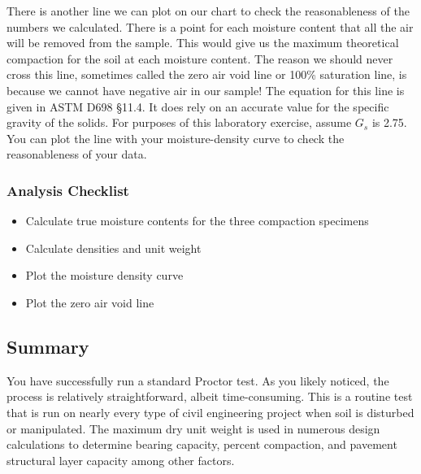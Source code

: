 \documentclass[12pt]{article}
\begin{document}
There is another line we can plot on our chart to check the reasonableness of the numbers we calculated. There is a point for each moisture content that all the air will be removed from the sample. This would give us the maximum theoretical compaction for the soil at each moisture content. The reason we should never cross this line, sometimes called the zero air void line or 100\% saturation line, is because we cannot have negative air in our sample! The equation for this line is given in ASTM D698 \S11.4. It does rely on an accurate value for the specific gravity of the solids. For purposes of this laboratory exercise, assume $G_s$ is 2.75. You can plot the line with your moisture-density curve to check the reasonableness of your data.

\subsubsection*{Analysis Checklist}
\begin{itemize}
    \item Calculate true moisture contents for the three compaction specimens
    \item Calculate densities and unit weight
    \item Plot the moisture density curve
    \item Plot the zero air void line
\end{itemize}

\subsection{Summary}
You have successfully run a standard Proctor test. As you likely noticed, the process is relatively straightforward, albeit time-consuming. This is a routine test that is run on nearly every type of civil engineering project when soil is disturbed or manipulated. The maximum dry unit weight is used in numerous design calculations to determine bearing capacity, percent compaction, and pavement structural layer capacity among other factors.



%
%

\end{document}
